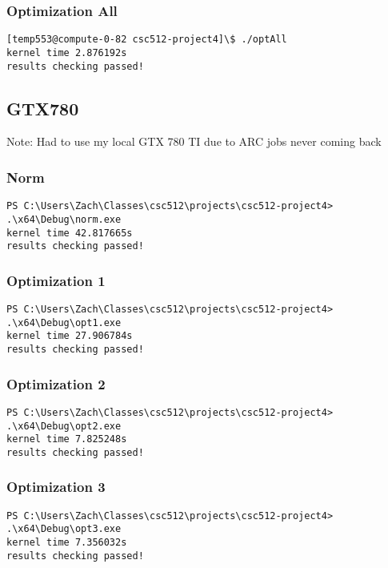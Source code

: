 \documentclass{article}
\begin{document}
  \subsubsection{Optimization All}
  \begin{lstlisting}[breaklines=true,basicstyle=\footnotesize]
[temp553@compute-0-82 csc512-project4]\$ ./optAll
kernel time 2.876192s
results checking passed!
  \end{lstlisting}

  \subsection{GTX780}
  Note: Had to use my local GTX 780 TI due to ARC jobs never coming back

  \subsubsection{Norm}
  \begin{lstlisting}[breaklines=true,basicstyle=\footnotesize]
PS C:\Users\Zach\Classes\csc512\projects\csc512-project4> .\x64\Debug\norm.exe
kernel time 42.817665s
results checking passed!
  \end{lstlisting}

  \subsubsection{Optimization 1}
  \begin{lstlisting}[breaklines=true,basicstyle=\footnotesize]
PS C:\Users\Zach\Classes\csc512\projects\csc512-project4> .\x64\Debug\opt1.exe
kernel time 27.906784s
results checking passed!
  \end{lstlisting}

  \subsubsection{Optimization 2}
  \begin{lstlisting}[breaklines=true,basicstyle=\footnotesize]
PS C:\Users\Zach\Classes\csc512\projects\csc512-project4> .\x64\Debug\opt2.exe
kernel time 7.825248s
results checking passed!
  \end{lstlisting}

  \subsubsection{Optimization 3}
  \begin{lstlisting}[breaklines=true,basicstyle=\footnotesize]
PS C:\Users\Zach\Classes\csc512\projects\csc512-project4> .\x64\Debug\opt3.exe
kernel time 7.356032s
results checking passed!
  \end{lstlisting}
\end{document}
